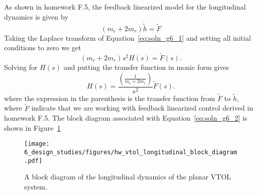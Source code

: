 As shown in homework F.5, the feedback linearized model for the longitudinal dynamics is given by 
\begin{equation}\label{eq:soln_g6_1}
( m_c + 2 m_r)\ddot{\tilde{h}} = \tilde{F}
\end{equation}
Taking the Laplace transform of Equation~\eqref{eq:soln_g6_1} and setting all initial conditions to zero we get
\[
( m_c + 2 m_r)s^2H(s) = \tilde{F}(s).
\]
Solving for $H(s)$ and putting the transfer function in monic form gives
\begin{equation}\label{eq:soln_g6_2}
H(s) = \frac{\left(\frac{1}{m_c + 2 m_r}\right)}{s^2}\tilde{F}(s).
\end{equation}
where the expression in the parenthesis is the transfer function from $\tilde{F}$ to $\tilde{h}$, where $\tilde{F}$ indicate that we are working with feedback linearized control derived in homework F.5. The block diagram associated with Equation~\eqref{eq:soln_g6_2} is shown in Figure~\ref{fig:hw_vtol_longitudinal_block_diagram}
\begin{figure}[htbp]
   \centering
   \texttt{[image: 6\_design\_studies/figures/hw\_vtol\_longitudinal\_block\_diagram.pdf]}
   \caption{A block diagram of the longitudinal dynamics of the planar VTOL system.}
   \label{fig:hw_vtol_longitudinal_block_diagram}
\end{figure} 



